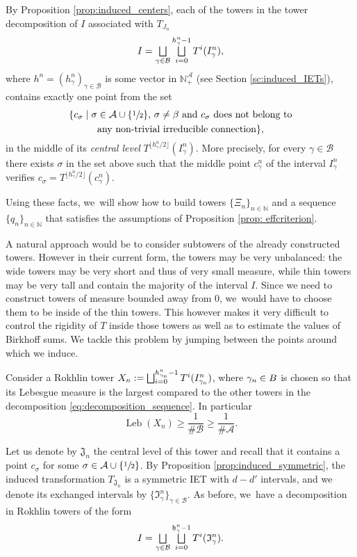 \documentclass[JEP,XML,SOM,Unicode,NoEqCountersInSection,NoFloatCountersInSection,published]{cedram}
\let\oldbigsqcup\bigsqcup
\renewcommand{\bigsqcup}{\mathop{\textstyle\oldbigsqcup}\displaylimits}
\DeclareMathOperator{\Leb}{Leb}
\theoremstyle{plain}
\theoremstyle{definition}
\newcommand{\A}{\mathcal{A}}
\newcommand{\B}{\mathcal{B}}
\newcommand{\N}{\mathbb{N}}
\begin{document}
By Proposition \ref{prop:induced_centers}, each of the towers in the tower decomposition of $I$ associated with $T_{J_n}$
\begin{equation}
\label{eq:decomposition_sequence}
I = \bigsqcup_{\gamma \in \B} \bigsqcup_{i = 0}^{h_\gamma^n - 1} T^i(I_\gamma^n),
\end{equation}
where $h^n = (h^n_\gamma)_{\gamma \in \B}$ is some vector in $\N^\A_+$ (see Section \ref{sc:induced_IETs}), contains exactly one point from the set
\begin{multline*}
 \{c _\sigma \mid \sigma \in \A \cup \{\sfrac{1}{2}\},\, \sigma \neq \beta \text{ and } c_\sigma \text{ does not belong to}\\
\text{any non-trivial irreducible connection}\},
\end{multline*}
in the middle of its \emph{central level} $T^{\lfloor h_\gamma^n/2
\rfloor}(I^n_\gamma)$. More precisely, for every $\gamma \in \B$ there exists
$\sigma$ in the set above such that the middle point $c_\gamma^n$ of the
interval $I_\gamma^n$ verifies $c_\sigma = T^{\lfloor h_\gamma^n/2
\rfloor}(c_\gamma^n)$.

Using these facts, we~will show how to build towers $\{\Xi_n\}_{n\in\N}$ and a sequence $\{q_n\}_{n\in\N}$ that satisfies the assumptions of Proposition \ref{prop: effcriterion}.

A natural approach would be to consider subtowers of the already constructed towers. However in their current form, the towers may be very unbalanced: the wide towers may be very short and thus of very small measure, while thin towers may be very tall and contain the majority of the interval $I$. Since we need to construct towers of measure bounded away from 0, we~would have to choose them to be inside of the thin towers. This however makes it very difficult to control the rigidity of $T$ inside those towers as well as to estimate the values of Birkhoff sums. We tackle this problem by jumping between the points around which we induce.

Consider a Rokhlin tower $X_n:=\bigsqcup_{i=0}^{h_{\gamma_n}^n-1}T^i(I^n_{\gamma_n})$, where $\gamma_n \in\mathcal \B$ is chosen so that its Lebesgue measure is the largest compared to the other towers in the decomposition \eqref{eq:decomposition_sequence}. In particular
\[
\Leb(X_n)\geq \frac{1}{\#\B}\ge\frac{1}{\#\A}.
\]

Let us denote by $\mathfrak J_n$ the central level of this tower and recall that it contains a point $c_\sigma$ for some $\sigma \in \A \cup \{\sfrac{1}{2}\}$. By Proposition \ref{prop:induced_symmetric}, the induced transformation $T_{\mathfrak J_n}$ is a symmetric IET with $d - d'$ intervals, and we denote its exchanged intervals by $\{\mathfrak I_{\gamma}^n\}_{\gamma \in \mathcal B}$. As before, we~have a decomposition in Rokhlin towers of the form
\[
 I = \bigsqcup_{\gamma \in \B} \bigsqcup_{i = 0}^{\mathfrak h_\gamma^n - 1} T^i(\mathfrak I_\gamma^n).
\]
\end{document}
